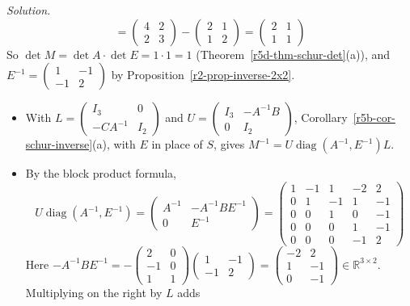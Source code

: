 \documentclass[12pt]{article}
\newcommand{\R}{\mathbb R}
\DeclareMathOperator{\diag}{diag}
\theoremstyle{definition}
\newenvironment{solution}{\par\noindent\textit{Solution.}\ }{\par\smallskip}
\begin{document}
\begin{solution}
\[=\begin{pmatrix}4&2\\2&3\end{pmatrix}-\begin{pmatrix}2&1\\1&2\end{pmatrix}=\begin{pmatrix}2&1\\1&1\end{pmatrix}
\]
So \(\det M=\det A\cdot\det E=1\cdot1=1\) (Theorem~\ref{r5d-thm-schur-det}(a)), and
\(E^{-1}=\left(\begin{smallmatrix}1&-1\\-1&2\end{smallmatrix}\right)\) by
Proposition~\ref{r2-prop-inverse-2x2}.
\begin{itemize}
\item With \(L=\left(\begin{smallmatrix}I_3&0\\-CA^{-1}&I_2\end{smallmatrix}\right)\) and
\(U=\left(\begin{smallmatrix}I_3&-A^{-1}B\\0&I_2\end{smallmatrix}\right)\),
Corollary~\ref{r5b-cor-schur-inverse}(a), with \(E\) in place of \(S\), gives \(M^{-1}=U\diag(A^{-1},E^{-1})L\).
\item By the block product formula,
\[
U\diag(A^{-1},E^{-1})=\begin{pmatrix}A^{-1}&-A^{-1}BE^{-1}\\0&E^{-1}\end{pmatrix}
=\left(\begin{array}{ccc|cc}1&-1&1&-2&2\\0&1&-1&1&-1\\0&0&1&0&-1\\\hline0&0&0&1&-1\\0&0&0&-1&2\end{array}\right)
\]
Here \(-A^{-1}BE^{-1}=-\left(\begin{smallmatrix}2&0\\-1&0\\1&1\end{smallmatrix}\right)\left(\begin{smallmatrix}1&-1\\-1&2\end{smallmatrix}\right)
=\left(\begin{smallmatrix}-2&2\\1&-1\\0&-1\end{smallmatrix}\right)\in\R^{3\times2}\). Multiplying on the right by \(L\) adds

\end{itemize}
\end{solution}
\end{document}
